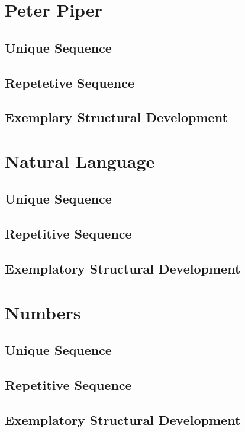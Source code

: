 \documentclass[11pt]{article}
\begin{document}
\section{Peter Piper}
\subsection{Unique Sequence}
\subsection{Repetetive Sequence}
\subsection{Exemplary Structural Development}

\section{Natural Language}
\subsection{Unique Sequence}
\subsection{Repetitive Sequence}
\subsection{Exemplatory Structural Development}

\section{Numbers}
\subsection{Unique Sequence}
\subsection{Repetitive Sequence}
\subsection{Exemplatory Structural Development}
\end{document}
